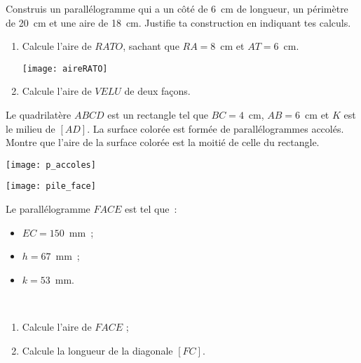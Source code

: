\begin{exercice}
Construis un parallélogramme qui a un côté de 6 cm de longueur, un périmètre de 20 cm et une aire de 18 cm. Justifie ta construction en indiquant tes calculs.
\end{exercice}


\begin{exercice}
\begin{enumerate}
 \item Calcule l'aire de $RATO$, sachant que $RA = 8$ cm et $AT = 6$ cm.
 \begin{center} \texttt{[image: aireRATO]} \end{center} 
 \item Calcule l'aire de $VELU$ de deux façons.
 \end{enumerate}
\end{exercice}


\begin{exercice}
Le quadrilatère $ABCD$ est un rectangle tel que $BC = 4$ cm, $AB = 6$ cm et $K$ est le milieu de $[AD]$. La surface colorée est formée de parallélogrammes accolés. Montre que l'aire de la surface colorée est la moitié de celle du rectangle.
 \begin{center} \texttt{[image: p\_accoles]} \end{center} 
\end{exercice}


\begin{exercice}
\begin{minipage}[c]{0.38\linewidth}
\texttt{[image: pile\_face]}
 \end{minipage} \hfill%
 \begin{minipage}[c]{0.58\linewidth}
Le parallélogramme $FACE$ est tel que :
 \begin{itemize}
  \item $EC = 150$ mm ;
  \item $h = 67$ mm ;
  \item $k = 53$ mm.
  \end{itemize}
  \end{minipage} \\
  \begin{enumerate}
   \item Calcule l'aire de $FACE$ ;
   \item Calcule la longueur de la diagonale $[FC]$.
   \end{enumerate}
\end{exercice}


